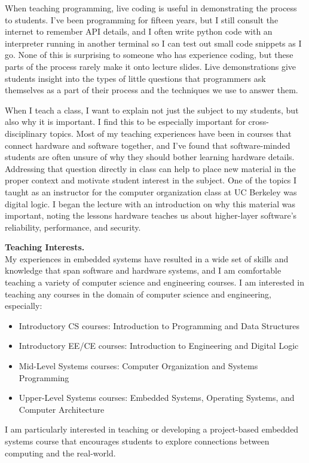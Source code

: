 \documentclass[12pt]{article} %
\begin{document}
When teaching programming, live coding is useful in demonstrating the process
to students\footnotemark. I've been programming for fifteen years, but I still
consult the internet to remember API details, and I often write python code
with an interpreter running in another terminal so I can test out small code
snippets as I go. None of this is surprising to someone who has experience
coding, but these parts of the process rarely make it onto lecture slides. Live
demonstrations give students insight into the types of little questions that
programmers ask themselves as a part of their process and the techniques we use
to answer them.


When I teach a class, I want to explain not just the subject to my students,
but also why it is important. I find this to be especially important for
cross-disciplinary topics. Most of my teaching experiences have been in courses
that connect hardware and software together, and I've found that
software-minded students are often unsure of why they should bother learning
hardware details. Addressing that question directly in class can help to place
new material in the proper context and motivate student interest in the
subject. One of the topics I taught as an instructor for the computer
organization class at UC Berkeley was digital logic. I began the lecture with
an introduction on why this material was important, noting the lessons hardware
teaches us about higher-layer software's reliability, performance, and
security.

\textbf{\textsf{\large Teaching Interests.}}\\
My experiences in embedded systems have resulted in a wide set of skills and
knowledge that span software and hardware systems, and I am comfortable
teaching a variety of computer science and engineering courses. I am interested
in teaching any courses in the domain of computer science and engineering,
especially:

\begin{itemize}
  \item Introductory CS courses: Introduction to Programming and Data Structures
  \item Introductory EE/CE courses: Introduction to Engineering and Digital Logic
  \item Mid-Level Systems courses: Computer Organization and Systems Programming
  \item Upper-Level Systems courses: Embedded Systems, Operating Systems, and Computer Architecture
\end{itemize}

I am particularly interested in teaching or developing a project-based embedded
systems course that encourages students to explore connections between
computing and the real-world.
\end{document}
